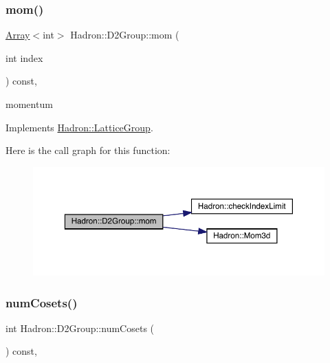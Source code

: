 \subsubsection{\texorpdfstring{mom()}{mom()}\hspace{0.1cm}{\footnotesize\ttfamily [2/2]}}
{\footnotesize\ttfamily \mbox{\hyperlink{classXMLArray_1_1Array}{Array}}$<$int$>$ Hadron\+::\+D2\+Group\+::mom (\begin{DoxyParamCaption}\item[{int}]{index }\end{DoxyParamCaption}) const\hspace{0.3cm}{\ttfamily [inline]}, {\ttfamily [virtual]}}

momentum 

Implements \mbox{\hyperlink{structHadron_1_1LatticeGroup_ad577b65041dd9a6e84b1f3bd49cb8fce}{Hadron\+::\+Lattice\+Group}}.

Here is the call graph for this function\+:
\nopagebreak
\begin{figure}[H]
\begin{center}
\leavevmode
\includegraphics[width=350pt]{d8/de7/structHadron_1_1D2Group_a65d28ef1fef635e870d60b6606b65f19_cgraph}
\end{center}
\end{figure}
\mbox{\label{structHadron_1_1D2Group_a1f8a4f5adef5a9a05edd39f14d21f1cd}} 
\subsubsection{\texorpdfstring{numCosets()}{numCosets()}\hspace{0.1cm}{\footnotesize\ttfamily [1/2]}}
{\footnotesize\ttfamily int Hadron\+::\+D2\+Group\+::num\+Cosets (\begin{DoxyParamCaption}{ }\end{DoxyParamCaption}) const\hspace{0.3cm}{\ttfamily [inline]}, {\ttfamily [virtual]}}

